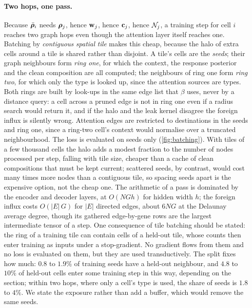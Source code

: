 \paragraph{Two hops, one pass.}
 Because $\bar{\boldsymbol{\rho}}_i$ needs $\boldsymbol{\rho}_j$, hence $\mathbf{w}_j$, hence $\mathbf{c}_j$, hence $\mathcal{N}_{j}$, a training step for cell $i$ reaches two graph hops even though the attention layer itself reaches one. Batching by \emph{contiguous spatial tile} makes this cheap, because the halo of extra cells around a tile is shared rather than disjoint. A tile's cells are the \emph{seeds}; their graph neighbours form \emph{ring one}, for which the context, the response posterior and the clean composition are all computed; the neighbours of ring one form \emph{ring two}, for which only the type is looked up, since the attention sources are types. Both rings are built by look-ups in the same edge list that $\beta$ uses, never by a distance query: a cell across a pruned edge is not in ring one even if a radius search would return it, and if the halo and the leak kernel disagree the foreign influx is silently wrong. Attention edges are restricted to destinations in the seeds and ring one, since a ring-two cell's context would normalise over a truncated neighbourhood. The loss is evaluated on seeds only (\cref{fig:batching}). With tiles of a few thousand cells the halo adds a modest fraction to the number of nodes processed per step, falling with tile size, cheaper than a cache of clean compositions that must be kept current; scattered seeds, by contrast, would cost many times more nodes than a contiguous tile, so spacing seeds apart is the expensive option, not the cheap one. The arithmetic of a pass is dominated by the encoder and decoder layers, at $O(NGh)$ for hidden width $h$; the foreign influx costs $O(|E|\,G)$ for $|E|$ directed edges, about $6NG$ at the Delaunay average degree, though its gathered edge-by-gene rows are the largest intermediate tensor of a step. One consequence of tile batching should be stated: the ring of a training tile can contain cells of a held-out tile, whose counts then enter training as inputs under a stop-gradient. No gradient flows from them and no loss is evaluated on them, but they are used transductively. The split fixes how much: $0.8$ to $1.9\%$ of training seeds have a held-out neighbour, and $4.8$ to $10\%$ of held-out cells enter some training step in this way, depending on the section; within two hops, where only a cell's type is used, the share of seeds is $1.8$ to $4\%$. We state the exposure rather than add a buffer, which would remove the same seeds.

